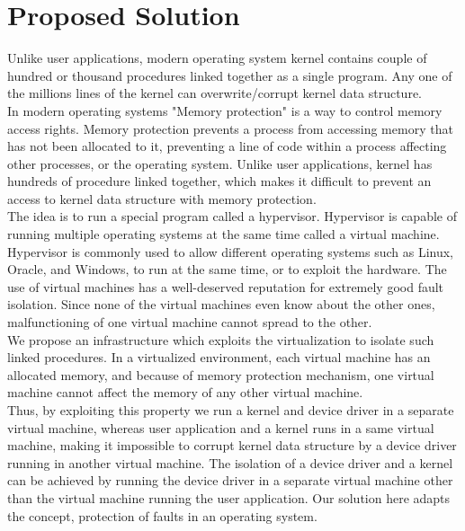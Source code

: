 \pagebreak
  
\section {Proposed Solution} 
Unlike user applications, modern operating system kernel contains couple of hundred or thousand procedures linked together as a single program\cite{Tanenbaum06canwe}. Any one of the millions lines of the kernel can overwrite/corrupt kernel data structure.
\\
In modern operating systems "Memory protection" is a way to control memory access rights. Memory protection prevents a process from accessing memory that has not been allocated to it, preventing a line of code within a process affecting other processes, or the operating system\cite{Denning:1970:VM:356571.356573}\cite{Galvin}. Unlike user applications, kernel has hundreds of procedure linked together, which makes it difficult to prevent an access to kernel data structure with memory protection.
\\
The idea is to run a special program called a hypervisor. Hypervisor is capable of running multiple operating systems at the same time called a virtual machine\cite{Goldberg:1973:AVM:800122.803950}. Hypervisor is commonly used to allow different operating systems such as Linux, Oracle, and Windows, to run at the same time, or to exploit the hardware. The use of virtual machines has a well-deserved reputation for extremely good fault isolation. Since none of the virtual machines even know about the other ones, malfunctioning of one virtual machine cannot spread to the other\cite{LeVasseur04UnmodifiedDriverReuse}.
\\
We propose an infrastructure which exploits the virtualization to isolate such linked procedures. In a virtualized environment, each virtual machine has an allocated memory, and because of memory protection mechanism, one virtual machine cannot affect the memory of any other virtual machine.
\\
Thus, by exploiting this property we run a kernel and device driver in a separate virtual machine, whereas user application and a kernel runs in a same virtual machine, making it impossible to corrupt kernel data structure by a device driver running in another virtual machine. The isolation of a device driver and a kernel can be achieved by running the device driver in a separate virtual machine other than the virtual machine running the user application. Our solution here adapts the concept, protection of faults in an operating system\cite{LeVasseur04UnmodifiedDriverReuse}.

